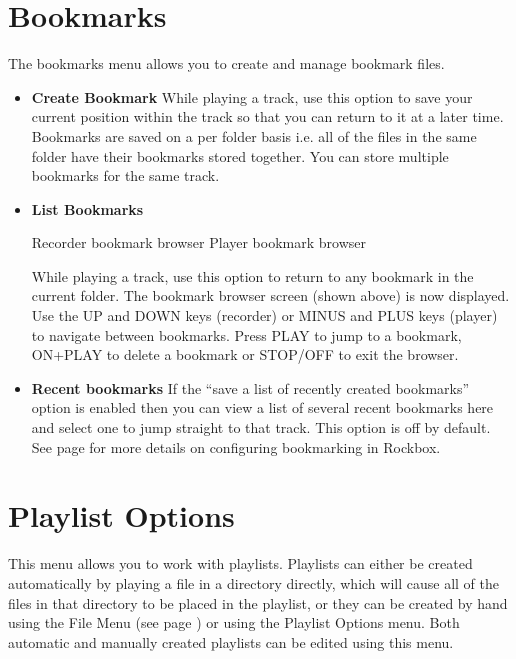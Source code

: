 \section{\label{ref:Bookmarkconfig}\label{ref:Bookmarkmenu}Bookmarks}
The bookmarks menu allows you to create and manage bookmark files.

\begin{itemize}

\item \textbf{Create Bookmark}
While playing a track, use this option to save your current position
within the track so that you can return to it at a later time. 
Bookmarks are saved on a per folder basis i.e. all of the files in the
same folder have their bookmarks stored together. You can store
multiple bookmarks for the same track.

\item \textbf{List Bookmarks}

Recorder bookmark browser  Player bookmark browser  

While playing a track, use this option to return to any bookmark in the current folder.  The bookmark browser
screen (shown above) is now displayed.  Use the UP and DOWN keys
(recorder) or MINUS and PLUS keys (player) to navigate between
bookmarks.  Press PLAY to jump to a bookmark, ON+PLAY to delete a
bookmark or STOP/OFF to exit the browser.

\item \textbf {Recent bookmarks}
If the ``save a list of recently created bookmarks'' option is enabled
then you can view a list of several recent bookmarks here and select
one to jump straight to that track.  This option is off by default. 
See page \pageref{ref:Bookmarkconfigactual} for more details on
configuring bookmarking in Rockbox. 

\end{itemize}

\section{\label{ref:playlistoptions}Playlist Options}
This menu allows you to work with playlists. 
Playlists can either be created automatically by playing a file in
a directory directly, which will cause all of the files in that
directory to be placed in the playlist, or they can be created by hand
using the File Menu (see page \pageref{ref:Filemenu})
or using the Playlist Options menu.  Both  automatic and manually
created playlists can be edited using this menu.


